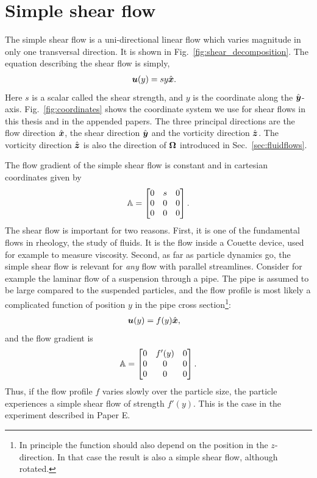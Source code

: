 \documentclass[thesis.tex]{subfiles}
\begin{document}
\section{Simple shear flow}\label{sec:shearflow}

The simple shear flow is a uni-directional linear flow which varies magnitude in only one transversal direction. It is shown in Fig.~\ref{fig:shear_decomposition}. The equation describing the shear flow is simply,
\begin{align}
	\mbox{\boldmath$u$}(y) &= s y \hat{\mbox{\boldmath$x$}}.
\end{align}
Here $s$ is a scalar called the shear strength, and $y$ is the coordinate along the $\hat{\mbox{\boldmath$y$}}$-axis. 
Fig.~\ref{fig:coordinates} shows the coordinate system we use for shear flows in this thesis and in the appended papers. The three principal directions are the flow direction $\hat{\mbox{\boldmath$x$}}$, the shear direction $\hat{\mbox{\boldmath$y$}}$ and the vorticity direction $\hat{\mbox{\boldmath$z$}}$. The vorticity direction $\hat{\mbox{\boldmath$z$}}$ is also the direction of $\mbox{\boldmath$\Omega$}$ introduced in Sec.~\ref{sec:fluidflows}.

The flow gradient of the simple shear flow is constant and in cartesian coordinates given by
\begin{align}
	\mathbb{A} = \begin{bmatrix}
		0 & s & 0 \\
		0 & 0 & 0 \\
		0 & 0 & 0 
	\end{bmatrix}.
\end{align}
The shear flow is important for two reasons. First, it is one of the fundamental flows in rheology, the study of fluids. It is the flow inside a Couette device, used for example to measure viscosity. Second, as far as particle dynamics go, the simple shear flow is relevant for \emph{any} flow with parallel streamlines. Consider for example the laminar flow of a suspension through a pipe. The pipe is assumed to be large compared to the suspended particles, and the flow profile is most likely a complicated function of position $y$ in the pipe cross section\footnote{In principle the function should also depend on the position in the $z$-direction. In that case the result is also a simple shear flow, although rotated.}:
\begin{align}
	\mbox{\boldmath$u$}(y) &= f(y)\hat{\mbox{\boldmath$x$}},
\end{align}
 and the flow gradient is
\begin{align}
	\mathbb{A} = \begin{bmatrix}
		0 & f'(y) & 0 \\
		0 & 0 & 0 \\
		0 & 0 & 0 
	\end{bmatrix}.
\end{align}
Thus, if the flow profile $f$ varies slowly over the particle size, the particle experiences a simple shear flow of strength $f'(y)$. This is the case in the experiment described in Paper E.
\end{document}
